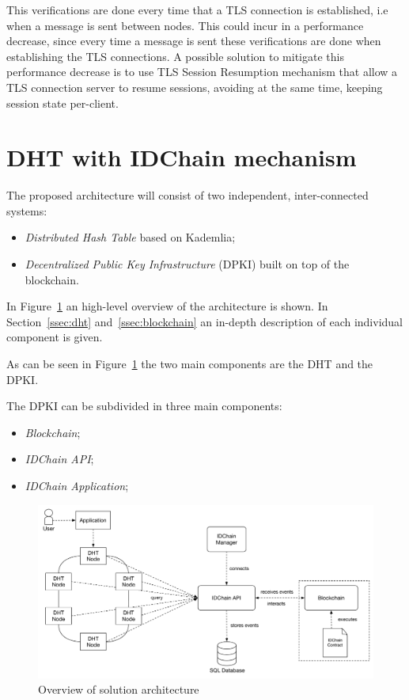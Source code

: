This verifications are done every time that a TLS connection is established, i.e when a message is sent between nodes.
This could incur in a performance decrease, since every time a message is sent these verifications are done when establishing the TLS connections.
A possible solution to mitigate this performance decrease is to use TLS Session Resumption\cite{rfc5077} mechanism that allow a TLS connection server to resume sessions, avoiding at the same time, keeping session state per-client.

\section{DHT with IDChain mechanism}\label{architecture:idchain-overview}

The proposed architecture will consist of two independent, inter-connected systems:

\begin{itemize}
  \item \textit{Distributed Hash Table} based on Kademlia;
  \item \textit{Decentralized Public Key Infrastructure} (DPKI) built on top of the blockchain.
\end{itemize}


In Figure~\ref{fig:architecture-overview} an high-level overview of the architecture is shown.
In Section~\ref{ssec:dht} and~\ref{ssec:blockchain} an in-depth description of each individual component is given.

As can be seen in Figure~\ref{fig:architecture-overview} the two main components are the \ac{DHT} and the \ac{DPKI}.

The DPKI can be subdivided in three main components:
\begin{itemize}
	\item \textit{Blockchain};
  \item \textit{IDChain API};
  \item \textit{IDChain Application};
\end{itemize}

\begin{figure}[htb]
  \includegraphics[width=\linewidth]{Figures/architecture-overview.pdf}
  \caption{Overview of solution architecture}
\label{fig:architecture-overview}
\end{figure}

